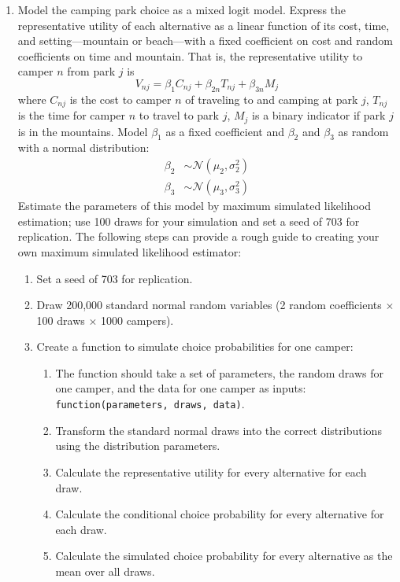 \documentclass[11pt,letterpaper]{article}
\begin{document}
\begin{enumerate}[label=\alph*., leftmargin=*]
	\item Model the camping park choice as a mixed logit model. Express the representative utility of each alternative as a linear function of its cost, time, and setting---mountain or beach---with a fixed coefficient on cost and random coefficients on time and mountain. That is, the representative utility to camper $n$ from park $j$ is
	$$V_{nj} = \beta_1 C_{nj} + \beta_{2n} T_{nj} + \beta_{3n} M_j$$
	where $C_{nj}$ is the cost to camper $n$ of traveling to and camping at park $j$, $T_{nj}$ is the time for camper $n$ to travel to park $j$, $M_j$ is a binary indicator if park $j$ is in the mountains. Model $\beta_1$ as a fixed coefficient and $\beta_2$ and $\beta_3$ as random with a normal distribution:
	\begin{align*}
		\beta_2 & \sim \mathcal{N}(\mu_2, \sigma_2^2) \\
		\beta_3 & \sim \mathcal{N}(\mu_3, \sigma_3^2)
	\end{align*}
	Estimate the parameters of this model by maximum simulated likelihood estimation; use 100 draws for your simulation and set a seed of 703 for replication. The following steps can provide a rough guide to creating your own maximum simulated likelihood estimator:
	\begin{enumerate}[label=\Roman*.]
		\item Set a seed of 703 for replication.
		\item Draw 200,000 standard normal random variables (2 random coefficients $\times$ 100 draws $\times$ 1000 campers).
		\item Create a function to simulate choice probabilities for one camper:
		\begin{enumerate}[label=\roman*.]
			\item The function should take a set of parameters, the random draws for one camper, and the data for one camper as inputs: \texttt{function(parameters, draws, data)}.
			\item Transform the standard normal draws into the correct distributions using the distribution parameters.
			\item Calculate the representative utility for every alternative for each draw.
			\item Calculate the conditional choice probability for every alternative for each draw.
			\item Calculate the simulated choice probability for every alternative as the mean over all draws.

\end{enumerate}
\end{enumerate}
\end{enumerate}
\end{document}
